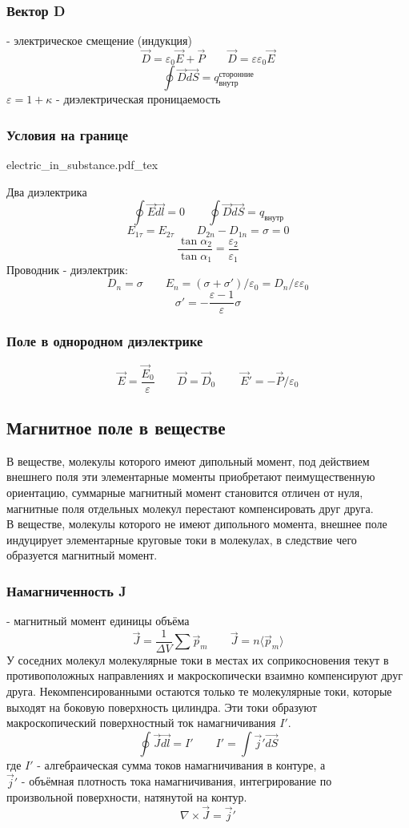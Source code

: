 \documentclass{article}
\newcommand{\incfig}[2][1]{%
    \def\svgwidth{#1\columnwidth}
    {#2.pdf_tex}
}
\begin{document}
\subsubsection{Вектор D}
- электрическое смещение (индукция)
\[\vec{D}=\varepsilon_{0}\vec{E}+\vec{P} \qquad \vec{D}=\varepsilon\varepsilon_{0}\vec{E}\]
\[\oint\vec{D}\vec{dS}=q_{\text{внутр}}^{\text{сторонние}}\]
$\varepsilon=1+\kappa$ - диэлектрическая проницаемость
\subsubsection{Условия на границе}
\incfig{electric_in_substance}
Два диэлектрика
\[\oint\vec{E}\vec{dl}=0 \qquad \oint\vec{D}\vec{dS}=q_{\text{внутр}}\]
\[E_{1\tau}=E_{2\tau} \qquad D_{2n}-D_{1n}=\sigma=0\]
\[\frac{\tan\alpha_{2}}{\tan\alpha_{1}}=\frac{\varepsilon_{2}}{\varepsilon_{1}}\]
Проводник - диэлектрик:
\[D_{n}=\sigma \qquad E_n=(\sigma + \sigma')/\varepsilon_0=D_n/\varepsilon\varepsilon_0\]
\[\sigma'=-\frac{\varepsilon-1}{\varepsilon}\sigma\]
\subsubsection{Поле в однородном диэлектрике}
\[\vec{E}=\frac{\vec{E}_{0}}{\varepsilon} \qquad \vec{D}=\vec{D}_{0}\ \qquad \vec{E}'=-\vec{P}/\varepsilon_{0}\]
\subsection{Магнитное поле в веществе}
В веществе, молекулы которого имеют дипольный момент, под действием внешнего поля эти элементарные моменты приобретают пеимущественную ориентацию, суммарные магнитный момент становится отличен от нуля, магнитные поля отдельных молекул перестают компенсировать друг друга. \\
В веществе, молекулы которого не имеют дипольного момента, внешнее поле индуцирует элементарные круговые токи в молекулах, в следствие чего образуется магнитный момент.
\subsubsection{Намагниченность J}
- магнитный момент единицы объёма
\[\vec{J}=\frac{1}{\Delta V}\sum \vec{p}_{m} \qquad \vec{J}=n\langle\vec{p}_{m}\rangle\]
У соседних молекул молекулярные токи в местах их соприкосновения текут в противоположных направлениях и макроскопически взаимно компенсируют друг друга. Некомпенсированными остаются только те молекулярные токи, которые выходят на боковую поверхность цилиндра. Эти токи образуют макроскопический поверхностный ток намагничивания $I'$.
\[\oint\vec{J}\vec{dl}=I' \qquad I'=\int\vec{j}'\vec{dS}\]
где $I'$ - алгебраическая сумма токов намагничивания в контуре, а \\ $\vec{j}'$ - объёмная плотность тока намагничивания, интегрирование по \\ произвольной поверхности, натянутой на контур.
\[\nabla\times\vec{J}=\vec{j}'\]
\end{document}
